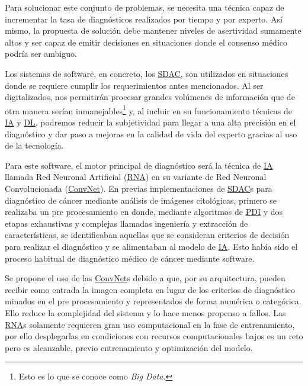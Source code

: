 Para solucionar este conjunto de problemas, se necesita una técnica capaz de
incrementar la tasa de diagnósticos realizados por tiempo y por experto. Así
mismo, la propuesta de solución debe mantener niveles de asertividad sumamente
altos y ser capaz de emitir decisiones en situaciones donde el consenso médico
podría ser ambiguo.~\cite{Meza-Palacios2017}

Los sistemas de software, en concreto, los \hyperlink{abbr}{SDAC}, son
utilizados en situaciones donde se requiere cumplir los requerimientos antes
mencionados. Al ser digitalizados, nos permitirán procesar grandes volúmenes de
información que de otra manera serían inmanejables\footnote{Esto es lo que se
conoce como \emph{Big Data}.} y, al incluir en su funcionamiento técnicas de
\hyperlink{abbr}{IA} y \hyperlink{abbr}{DL}, podremos reducir la subjetividad
para llegar a una alta precisión en el diagnóstico y dar paso a mejoras en la
calidad de vida del experto gracias al uso de la
tecnología.~\cite{DominguezHernandez2013} 

Para este software, el motor principal de diagnóstico será la técnica de
\hyperlink{abbr}{IA} llamada Red Neuronal Artificial
(\hyperlink{abbr}{RNA}) en su
variante de Red Neuronal Convolucionada
(\hyperlink{abbr}{ConvNet}).
En previas implementaciones de \hyperlink{abbr}{SDAC}s para diagnóstico de
cáncer mediante análisis de imágenes citológicas, primero se realizaba un pre
procesamiento en donde, mediante algoritmos de \hyperlink{abbr}{PDI} y dos
etapas exhaustivas y complejas llamadas ingeniería y extracción de
características, se identificaban aquellas que se consideran criterios de
decisión para realizar el diagnóstico y se alimentaban al modelo de
\hyperlink{abbr}{IA}. Esto había sido el proceso habitual de diagnóstico médico
de cáncer mediante software.~\cite{Ashok2016} 

Se propone el uso de las \hyperlink{abbr}{ConvNet}s debido a que, por su
arquitectura, pueden recibir como entrada la imagen completa en lugar de los
criterios de diagnóstico minados en el pre procesamiento y representados de
forma numérica o categórica. Ello reduce la complejidad del sistema y lo hace
menos propenso a fallos. Las \hyperlink{abbr}{RNA}s solamente requieren gran uso
computacional en la fase de entrenamiento, por ello desplegarlas en condiciones
con recursos computacionales bajos es un reto pero es alcanzable, previo
entrenamiento y optimización del modelo.~\cite{Lee2017} 

